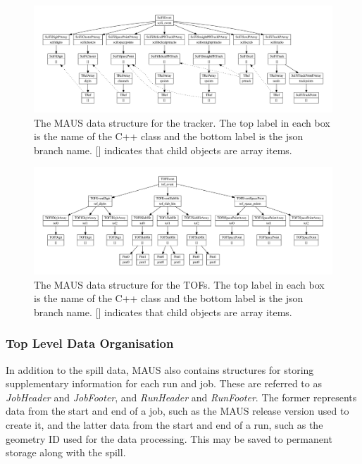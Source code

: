 \documentclass{JINST}
\begin{document}
\begin{figure}[ptb]
\centering
\includegraphics[width=1.0\textwidth]{figs/scifi_datastructure.pdf}
\caption{The MAUS data structure for the tracker. The top label in each box is the name of the C++ class and the bottom label is the json branch name. []  indicates that child objects are array items.}
\label{fig:datastructure-recon-scifi}
\end{figure}

\begin{figure}[ptb]
\centering
\includegraphics[width=1.0\textwidth]{figs/tof_datastructure.pdf}
\caption{The MAUS data structure for the TOFs. The top label in each box is the name of the C++ class and the bottom label is the json branch name. [] indicates that child objects are array items.}
\label{fig:datastructure-recon-tof}
\end{figure}

\FloatBarrier

\subsubsection{Top Level Data Organisation} \label{sec:top-level-datastr}

In addition to the spill data, MAUS also contains structures for storing supplementary information for each run and job. These are referred to as \emph{JobHeader} and \emph{JobFooter}, and \emph{RunHeader} and \emph{RunFooter}. The former represents data from the start and end of a job, such as the MAUS release version used to create it, and the latter data from the start and end of a run, such as the geometry ID used for the data processing. This may be saved to permanent storage along with the spill.
\end{document}
